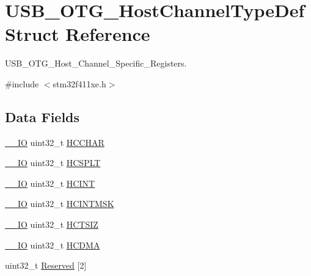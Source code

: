 \hypertarget{struct_u_s_b___o_t_g___host_channel_type_def}{}\section{U\+S\+B\+\_\+\+O\+T\+G\+\_\+\+Host\+Channel\+Type\+Def Struct Reference}
\label{struct_u_s_b___o_t_g___host_channel_type_def}


U\+S\+B\+\_\+\+O\+T\+G\+\_\+\+Host\+\_\+\+Channel\+\_\+\+Specific\+\_\+\+Registers.  




{\ttfamily \#include $<$stm32f411xe.\+h$>$}

\subsection*{Data Fields}
\begin{DoxyCompactItemize}
\item 
\hyperlink{core__sc300_8h_aec43007d9998a0a0e01faede4133d6be}{\+\_\+\+\_\+\+IO} uint32\+\_\+t \hyperlink{struct_u_s_b___o_t_g___host_channel_type_def_a6f1e046a654010fb0da5eec942fb9a8d}{H\+C\+C\+H\+AR}
\item 
\hyperlink{core__sc300_8h_aec43007d9998a0a0e01faede4133d6be}{\+\_\+\+\_\+\+IO} uint32\+\_\+t \hyperlink{struct_u_s_b___o_t_g___host_channel_type_def_a23b3abb27cf5acff0edc709c90e2e5cb}{H\+C\+S\+P\+LT}
\item 
\hyperlink{core__sc300_8h_aec43007d9998a0a0e01faede4133d6be}{\+\_\+\+\_\+\+IO} uint32\+\_\+t \hyperlink{struct_u_s_b___o_t_g___host_channel_type_def_a6735bbd8fbc28f897f1b44df95f52873}{H\+C\+I\+NT}
\item 
\hyperlink{core__sc300_8h_aec43007d9998a0a0e01faede4133d6be}{\+\_\+\+\_\+\+IO} uint32\+\_\+t \hyperlink{struct_u_s_b___o_t_g___host_channel_type_def_a8edfae19390d323525449d2444e93984}{H\+C\+I\+N\+T\+M\+SK}
\item 
\hyperlink{core__sc300_8h_aec43007d9998a0a0e01faede4133d6be}{\+\_\+\+\_\+\+IO} uint32\+\_\+t \hyperlink{struct_u_s_b___o_t_g___host_channel_type_def_a14cb8c8dbbafdef182c82c0493ca48ab}{H\+C\+T\+S\+IZ}
\item 
\hyperlink{core__sc300_8h_aec43007d9998a0a0e01faede4133d6be}{\+\_\+\+\_\+\+IO} uint32\+\_\+t \hyperlink{struct_u_s_b___o_t_g___host_channel_type_def_a4204a2dcbc14fb11d371fc45b9f3170f}{H\+C\+D\+MA}
\item 
uint32\+\_\+t \hyperlink{struct_u_s_b___o_t_g___host_channel_type_def_aa85d014d19b79d61bed7fdf134ed1037}{Reserved} \mbox{[}2\mbox{]}
\end{DoxyCompactItemize}


